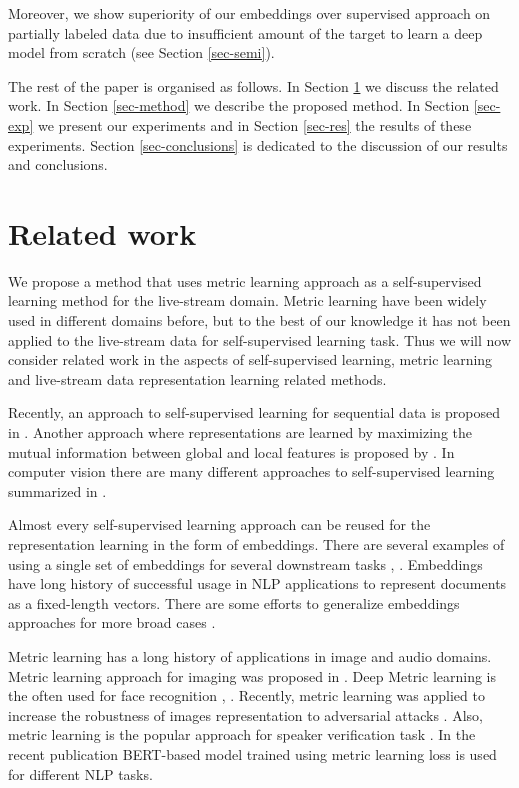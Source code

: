 \documentclass[sigconf]{acmart}
\begin{document}
Moreover, we show superiority of our embeddings over supervised approach on partially labeled data due to insufficient amount of the target to learn a deep model from scratch (see Section \ref{sec-semi}).

The rest of the paper is organised as follows. In Section \ref{sec-rel-work} we discuss the related work. In Section \ref{sec-method} we describe the proposed method. In Section \ref{sec-exp} we present our experiments and in Section \ref{sec-res}  the results of these experiments. Section \ref{sec-conclusions} is dedicated to the discussion of our results and conclusions.

\section{Related work}  \label{sec-rel-work}

We propose a method that uses metric learning approach as a self-supervised learning method for the live-stream domain. Metric learning have been widely used in different domains before, but to the best of our knowledge it has not been applied to the live-stream data for self-supervised learning task. Thus we will now consider related work in the aspects of self-supervised learning, metric learning and live-stream data representation learning related methods.

Recently, an approach to self-supervised learning for sequential data is proposed in \cite{DBLP:journals/corr/abs-1807-03748}. Another approach where representations are learned by maximizing the mutual information between global and local features is proposed by \cite{hjelm2018learning}. In computer vision there are many different approaches to self-supervised learning summarized in \cite{jing2019selfsupervised}. 

Almost every self-supervised learning approach can be reused for the representation learning in the form of embeddings. There are several examples of using a single set of embeddings for several downstream tasks \cite{Song2017LearningUE}, \cite{Zhai:2019:LUE:3292500.3330739}.
Embeddings have long history of successful usage in NLP applications to represent documents as a fixed-length vectors. There are some efforts to generalize embeddings approaches for more broad cases \cite{Wu2017StarSpaceEA}.

Metric learning has a long history of applications in image and audio domains. Metric learning approach for imaging was proposed in \cite{Hadsell:2006:DRL:1153171.1153654}. 
Deep Metric learning is the often used for face recognition \cite{Schroff2015FaceNetAU}, \cite{kaya2019deep}. Recently, metric learning was applied to increase the robustness of images representation to adversarial attacks \cite{Mao2019AdvRobust}. Also, metric learning is the popular approach for speaker verification task \cite{wan2017generalized}.
In the recent publication \cite{reimers-2019-sentence-bert} BERT-based model \cite{Devlin2019BERTPO} trained using metric learning loss is used for different NLP tasks.
\end{document}
